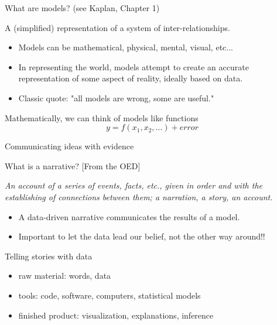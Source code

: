 \documentclass[table]{beamer}\usepackage[]{graphicx}\usepackage[]{color}
\begin{document}
\begin{frame}{What are models? (see Kaplan, Chapter 1)}


\begin{block}{A (simplified) representation of a system of inter-relationships.}

\begin{itemize}
	\item Models can be mathematical, physical, mental, visual, etc...
	\item In representing the world, models attempt to create an accurate representation of some aspect of reality, ideally based on data.
	\item Classic quote: "all models are wrong, some are useful."
\end{itemize}

\end{block}

Mathematically, we can think of models like functions
$$ y = f(x_1, x_2, ...) + error $$



\end{frame}



\begin{frame}{Communicating ideas with evidence}

\begin{block}{What is a narrative? [From the OED]}

\em An account of a series of events, facts, etc., given in order and with the establishing of connections between them; a narration, a story, an account.

\em 
\begin{itemize}
  \item A data-driven narrative communicates the results of a model.
  \item Important to let the data lead our belief, not the other way around!!
\end{itemize}

\end{block}

\bigskip

\begin{block}{Telling stories with data}

\begin{itemize}
	\item raw material: words, data
	\item tools: code, software, computers, statistical models
	\item finished product: visualization, explanations, inference
\end{itemize}

\end{block}


\end{frame}
\end{document}
